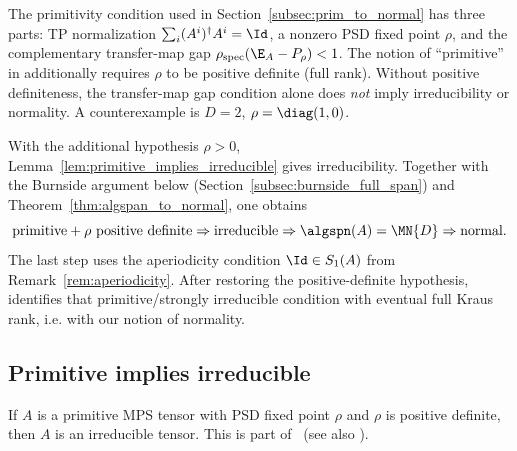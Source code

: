 \begin{remark}%
    \label{rem:prim_definition_mismatch}\leanok
    The primitivity condition used in Section~\ref{subsec:prim_to_normal}
    has three parts: TP normalization $\sum_i (A^i)^\dagger A^i = \Id$,
    a nonzero PSD fixed point $\rho$, and the complementary transfer-map gap
    $\rho_{\mathrm{spec}}(\E_A - P_\rho) < 1$.
    The notion of ``primitive'' in
    \cite[Proposition~3]{Sanz2010Quantum} additionally requires
    $\rho$ to be positive definite (full rank).
    Without positive definiteness, the transfer-map gap condition alone
    does \emph{not} imply irreducibility or normality.
    A counterexample is $D = 2$, $\rho = \diag(1,0)$.

    With the additional hypothesis $\rho > 0$,
    Lemma~\ref{lem:primitive_implies_irreducible} gives
    irreducibility.
    Together with the Burnside argument below
    (Section~\ref{subsec:burnside_full_span})
    and Theorem~\ref{thm:algspan_to_normal}, one obtains
    \[
        \text{primitive} + \rho \text{ positive definite}
        \Rightarrow
        \text{irreducible}
        \Rightarrow
        \algspn(A) = \MN{D}
        \Rightarrow
        \text{normal}.
    \]
    The last step uses the aperiodicity condition
    $\Id \in S_1(A)$ from Remark~\ref{rem:aperiodicity}.
    After restoring the positive-definite hypothesis,
    \cite[Proposition~3]{Sanz2010Quantum} identifies that
    primitive/strongly irreducible condition with eventual full
    Kraus rank, i.e. with our notion of normality.
\end{remark}

\subsection{Primitive implies irreducible}\label{subsec:prim_implies_irred}

\begin{lemma}%
    \label{lem:primitive_implies_irreducible}
    \leanok
    If $A$ is a primitive MPS tensor with PSD fixed point $\rho$
    and $\rho$ is positive definite, then $A$ is an irreducible tensor.
    This is part of~\cite[Proposition~3]{Sanz2010Quantum}
    (see also \cite[Section~2.3]{Cirac2016MPDO_arXiv}).
\end{lemma}

